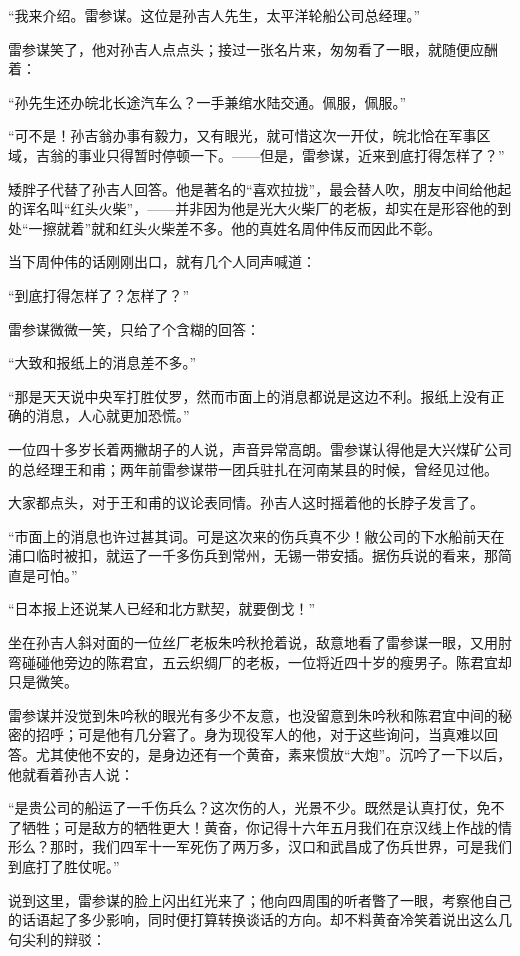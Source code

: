 \par “我来介绍。雷参谋。这位是孙吉人先生，太平洋轮船公司总经理。”
\par 雷参谋笑了，他对孙吉人点点头；接过一张名片来，匆匆看了一眼，就随便应酬着：
\par “孙先生还办皖北长途汽车么？一手兼绾水陆交通。佩服，佩服。”
\par “可不是！孙吉翁办事有毅力，又有眼光，就可惜这次一开仗，皖北恰在军事区域，吉翁的事业只得暂时停顿一下。——但是，雷参谋，近来到底打得怎样了？”
\par 矮胖子代替了孙吉人回答。他是著名的“喜欢拉拢”，最会替人吹，朋友中间给他起的诨名叫“红头火柴”，——并非因为他是光大火柴厂的老板，却实在是形容他的到处“一擦就着”就和红头火柴差不多。他的真姓名周仲伟反而因此不彰。
\par 当下周仲伟的话刚刚出口，就有几个人同声喊道：
\par “到底打得怎样了？怎样了？”
\par 雷参谋微微一笑，只给了个含糊的回答：
\par “大致和报纸上的消息差不多。”
\par “那是天天说中央军打胜仗罗，然而市面上的消息都说是这边不利。报纸上没有正确的消息，人心就更加恐慌。”
\par 一位四十多岁长着两撇胡子的人说，声音异常高朗。雷参谋认得他是大兴煤矿公司的总经理王和甫；两年前雷参谋带一团兵驻扎在河南某县的时候，曾经见过他。
\par 大家都点头，对于王和甫的议论表同情。孙吉人这时摇着他的长脖子发言了。
\par “市面上的消息也许过甚其词。可是这次来的伤兵真不少！敝公司的下水船前天在浦口临时被扣，就运了一千多伤兵到常州，无锡一带安插。据伤兵说的看来，那简直是可怕。”
\par “日本报上还说某人已经和北方默契，就要倒戈！”
\par 坐在孙吉人斜对面的一位丝厂老板朱吟秋抢着说，敌意地看了雷参谋一眼，又用肘弯碰碰他旁边的陈君宜，五云织绸厂的老板，一位将近四十岁的瘦男子。陈君宜却只是微笑。
\par 雷参谋并没觉到朱吟秋的眼光有多少不友意，也没留意到朱吟秋和陈君宜中间的秘密的招呼；可是他有几分窘了。身为现役军人的他，对于这些询问，当真难以回答。尤其使他不安的，是身边还有一个黄奋，素来惯放“大炮”。沉吟了一下以后，他就看着孙吉人说：
\par “是贵公司的船运了一千伤兵么？这次伤的人，光景不少。既然是认真打仗，免不了牺牲；可是敌方的牺牲更大！黄奋，你记得十六年五月我们在京汉线上作战的情形么？那时，我们四军十一军死伤了两万多，汉口和武昌成了伤兵世界，可是我们到底打了胜仗呢。”
\par 说到这里，雷参谋的脸上闪出红光来了；他向四周围的听者瞥了一眼，考察他自己的话语起了多少影响，同时便打算转换谈话的方向。却不料黄奋冷笑着说出这么几句尖利的辩驳：

